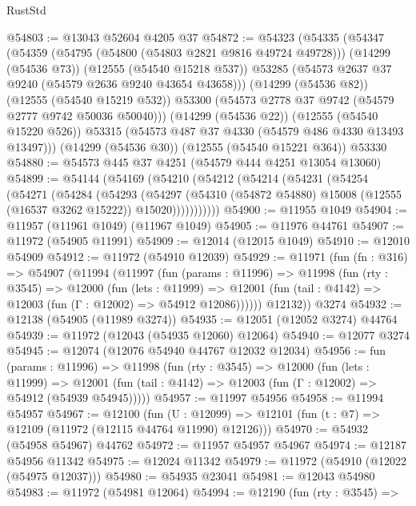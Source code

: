 \begin{lexlean}{RustStd}
\begin{coremodule}
@54803 := @13043 @52604 @4205 @37
@54872 := @54323
    (@54335
      (@54347
        (@54359
          (@54795 (@54800 (@54803 @2821 @9816 @49724 @49728)))
          (@14299 (@54536 @73))
          (@12555 (@54540 @15218 @537))
          @53285
          (@54573 @2637 @37 @9240 (@54579 @2636 @9240 @43654 @43658)))
        (@14299 (@54536 @82))
        (@12555 (@54540 @15219 @532))
        @53300
        (@54573 @2778 @37 @9742 (@54579 @2777 @9742 @50036 @50040)))
      (@14299 (@54536 @22))
      (@12555 (@54540 @15220 @526))
      @53315
      (@54573 @487 @37 @4330 (@54579 @486 @4330 @13493 @13497)))
    (@14299 (@54536 @30))
    (@12555 (@54540 @15221 @364))
    @53330
@54880 := @54573 @445 @37 @4251 (@54579 @444 @4251 @13054 @13060)
@54899 := @54144
    (@54169
      (@54210
        (@54212
          (@54214
            (@54231
              (@54254
                (@54271
                  (@54284
                    (@54293
                      (@54297
                        (@54310
                          (@54872 @54880)
                          @15008
                          (@12555 (@16537 @3262 @15222))
                          @15020)))))))))))
@54900 := @11955 @1049
@54904 := @11957 (@11961 @1049) (@11967 @1049)
@54905 := @11976 @44761
@54907 := @11972 (@54905 @11991)
@54909 := @12014 (@12015 @1049)
@54910 := @12010 @54909
@54912 := @11972 (@54910 @12039)
@54929 := @11971
    (fun (fn : @316) =>
    @54907
      (@11994
        (@11997
          (fun (params : @11996) =>
          @11998
            (fun (rty : @3545) =>
            @12000
              (fun (lets : @11999) =>
              @12001 (fun (tail : @4142) => @12003 (fun (Γ : @12002) => @54912 @12086))))))
        @12132))
    @3274
@54932 := @12138 (@54905 (@11989 @3274))
@54935 := @12051 (@12052 @3274) @44764
@54939 := @11972 (@12043 (@54935 @12060) @12064)
@54940 := @12077 @3274
@54945 := @12074 (@12076 @54940 @44767 @12032 @12034)
@54956 := fun (params : @11996) =>
  @11998
    (fun (rty : @3545) =>
    @12000
      (fun (lets : @11999) =>
      @12001 (fun (tail : @4142) => @12003 (fun (Γ : @12002) => @54912 (@54939 @54945)))))
@54957 := @11997 @54956
@54958 := @11994 @54957
@54967 := @12100
    (fun (U : @12099) => @12101 (fun (t : @7) => @12109 (@11972 (@12115 @44764 @11990) @12126)))
@54970 := @54932 (@54958 @54967) @44762
@54972 := @11957 @54957 @54967
@54974 := @12187 @54956 @11342
@54975 := @12024 @11342
@54979 := @11972 (@54910 (@12022 (@54975 @12037)))
@54980 := @54935 @23041
@54981 := @12043 @54980
@54983 := @11972 (@54981 @12064)
@54994 := @12190
    (fun (rty : @3545) =>

\end{coremodule}
\end{lexlean}
